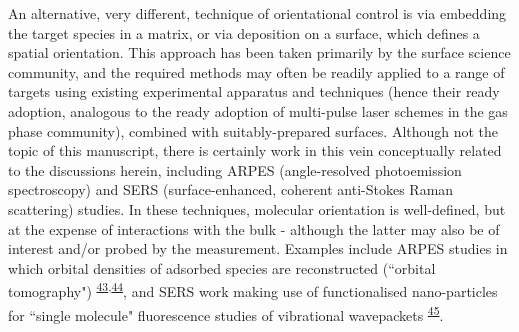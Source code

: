\documentclass[10pt]{article}
\begin{document}
An alternative, very different, technique of orientational control is via embedding the target species in a matrix, or via deposition on a surface, which defines a spatial orientation. This approach has been taken primarily by the surface science community, and the required methods may often be readily applied to a range of targets using existing experimental apparatus and techniques (hence their ready adoption, analogous to the ready adoption of multi-pulse laser schemes in the gas phase community), combined with suitably-prepared surfaces. Although not the topic of this manuscript, there is certainly work in this vein conceptually related to the discussions herein, including ARPES (angle-resolved photoemission spectroscopy) and SERS (surface-enhanced, coherent anti-Stokes Raman scattering) studies. In these techniques, molecular orientation is well-defined, but at the expense of interactions with the bulk - although the latter may also be of interest and/or probed by the measurement. 
Examples include ARPES studies in which orbital densities of adsorbed species are reconstructed (``orbital tomography") \textsuperscript{\hyperref[csl:43]{43},\hyperref[csl:44]{44}}, and SERS work making use of functionalised nano-particles for ``single molecule" fluorescence studies of vibrational wavepackets \textsuperscript{\hyperref[csl:45]{45}}. 




\end{document}
